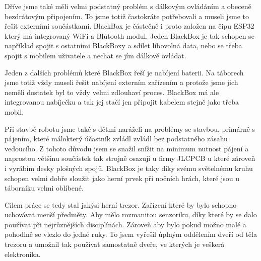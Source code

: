     Dříve jsme také měli velmi podstatný problém s dálkovým ovládáním a obeceně bezdrátovým připojením.
    To jsme totiž častokráte potřebovali a museli jsme to řešit externími součástkami.
    BlackBox je částečně i proto založen na čipu ESP32 který má integrovaný WiFi a Blutooth modul.
    Jeden BlackBox je tak schopen se například spojit s ostatními BlackBoxy a sdílet libovolná data, 
    nebo se třeba spojit s mobilem uživatele a nechat se jím dálkově ovládat.
    
    Jeden z dalších problémů které BlackBox řeší je nabíjení baterii. Na táborech jsme totiž vždy museli
    řešit nabíjení externím zařízením a protože jsme jich neměli dostatek byl to vždy velmi zdlouhaví proces.
    BlackBox má ale integrovanou nabíječku a tak jej stačí jen připojit kabelem stejně jako třeba mobil.

    Při stavbě robotu jsme také s dětmi naráželi na problémy se stavbou, primárně s pájením, které málokterý 
    účastník zvládl zvládl bez podstatného zásahu vedoucího. Z tohoto důvodu jsem se snažil snížit na minimum 
    nutnost pájení a naprostou většinu součástek tak strojně osazuji u firmy JLCPCB u které zároveň i vyrábím 
    desky plošných spojů.
    BlackBox je taky díky svému světelnému kruhu schopen velmi dobře sloužit jako herní prvek při nočních hrách,
    které jsou u táborníku velmi oblíbené.  %

    Cílem práce se tedy stal jakýsi herní trezor. Zařízení které by bylo schopno uchovávat 
    menší předměty. Aby mělo rozmanitou senzoriku, díky které by se dalo používat při 
    nejrůznějších disciplínách. Zároveň aby bylo pokud možno malé a pohodlně se vlezlo 
    do jedné ruky. To jsem vyřešil úplným oddělením dveří od těla trezoru a umožnil 
    tak používat samostatně dveře, ve kterých je veškerá elektronika.

